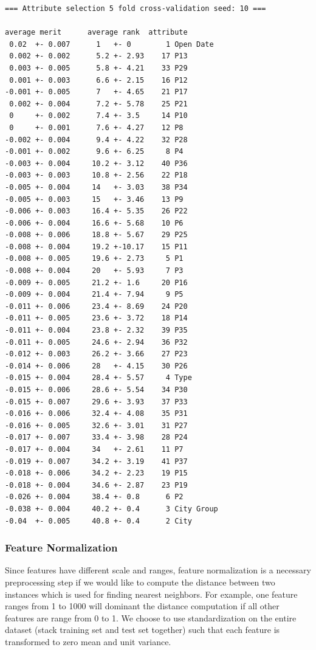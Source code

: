 \documentclass[10pt, oneside]{article}   	%
\begin{document}
{\scriptsize
\begin{verbatim}
=== Attribute selection 5 fold cross-validation seed: 10 ===

average merit      average rank  attribute
 0.02  +- 0.007      1   +- 0        1 Open Date
 0.002 +- 0.002      5.2 +- 2.93    17 P13
 0.003 +- 0.005      5.8 +- 4.21    33 P29
 0.001 +- 0.003      6.6 +- 2.15    16 P12
-0.001 +- 0.005      7   +- 4.65    21 P17
 0.002 +- 0.004      7.2 +- 5.78    25 P21
 0     +- 0.002      7.4 +- 3.5     14 P10
 0     +- 0.001      7.6 +- 4.27    12 P8
-0.002 +- 0.004      9.4 +- 4.22    32 P28
-0.001 +- 0.002      9.6 +- 6.25     8 P4
-0.003 +- 0.004     10.2 +- 3.12    40 P36
-0.003 +- 0.003     10.8 +- 2.56    22 P18
-0.005 +- 0.004     14   +- 3.03    38 P34
-0.005 +- 0.003     15   +- 3.46    13 P9
-0.006 +- 0.003     16.4 +- 5.35    26 P22
-0.006 +- 0.004     16.6 +- 5.68    10 P6
-0.008 +- 0.006     18.8 +- 5.67    29 P25
-0.008 +- 0.004     19.2 +-10.17    15 P11
-0.008 +- 0.005     19.6 +- 2.73     5 P1
-0.008 +- 0.004     20   +- 5.93     7 P3
-0.009 +- 0.005     21.2 +- 1.6     20 P16
-0.009 +- 0.004     21.4 +- 7.94     9 P5
-0.011 +- 0.006     23.4 +- 8.69    24 P20
-0.011 +- 0.005     23.6 +- 3.72    18 P14
-0.011 +- 0.004     23.8 +- 2.32    39 P35
-0.011 +- 0.005     24.6 +- 2.94    36 P32
-0.012 +- 0.003     26.2 +- 3.66    27 P23
-0.014 +- 0.006     28   +- 4.15    30 P26
-0.015 +- 0.004     28.4 +- 5.57     4 Type
-0.015 +- 0.006     28.6 +- 5.54    34 P30
-0.015 +- 0.007     29.6 +- 3.93    37 P33
-0.016 +- 0.006     32.4 +- 4.08    35 P31
-0.016 +- 0.005     32.6 +- 3.01    31 P27
-0.017 +- 0.007     33.4 +- 3.98    28 P24
-0.017 +- 0.004     34   +- 2.61    11 P7
-0.019 +- 0.007     34.2 +- 3.19    41 P37
-0.018 +- 0.006     34.2 +- 2.23    19 P15
-0.018 +- 0.004     34.6 +- 2.87    23 P19
-0.026 +- 0.004     38.4 +- 0.8      6 P2
-0.038 +- 0.004     40.2 +- 0.4      3 City Group
-0.04  +- 0.005     40.8 +- 0.4      2 City
 \end{verbatim}
}



\subsubsection{Feature Normalization}
Since features have different scale and ranges, feature normalization is a necessary preprocessing step if we would like to compute the distance between two instances which is used for finding nearest neighbors. 
For example, one feature ranges from 1 to 1000 will dominant the distance computation if all other features are range from 0 to 1.
We choose to use standardization on the entire dataset (stack training set and test set together) such that each feature is transformed to zero mean and unit variance.
\end{document}

